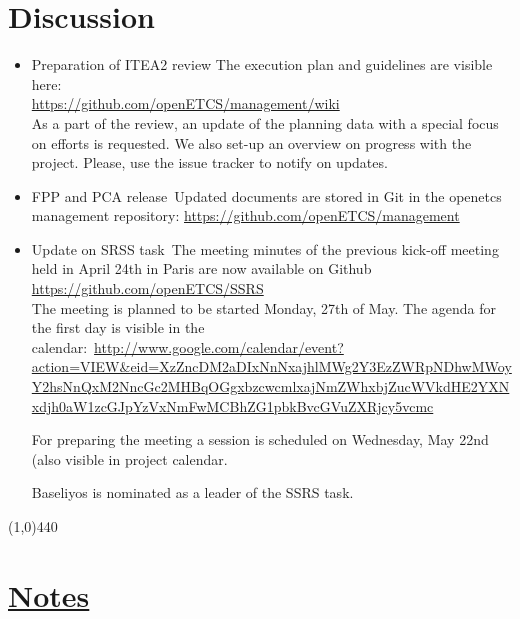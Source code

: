\documentclass[a4paper, 11pt]{article}
\begin{document}
\section{Discussion}
\begin{itemize}
\item Preparation of ITEA2 review
The execution plan and guidelines are visible here:\\
\url{https://github.com/openETCS/management/wiki}\\
As a part of the review, an update of the planning data with a special focus on efforts is requested. We also set-up an overview on progress with the project. Please, use the issue tracker to notify on updates.

\item FPP and PCA release\
Updated documents are stored in Git in the openetcs management repository:
\url{https://github.com/openETCS/management}\\

\item Update on SRSS task\
The meeting minutes of the previous kick-off meeting held in April 24th in Paris are now available on Github \url{https://github.com/openETCS/SSRS}\\
The meeting is planned to be started Monday, 27th of May. The agenda for the first day is visible in the calendar:\
\url{http://www.google.com/calendar/event?action=VIEW&eid=XzZncDM2aDIxNnNxajhlMWg2Y3EzZWRpNDhwMWoyY2hsNnQxM2NncGc2MHBqOGgxbzcwcmlxajNmZWhxbjZucWVkdHE2YXNxdjh0aW1zcGJpYzVxNmFwMCBhZG1pbkBvcGVuZXRjcy5vcmc}

For preparing the meeting a session is scheduled on Wednesday, May 22nd (also visible in project calendar.

Baseliyos is nominated as a leader of the SSRS task.


\end{itemize}

\line(1,0){440}
\section{\underline{Notes}}
\end{document}
